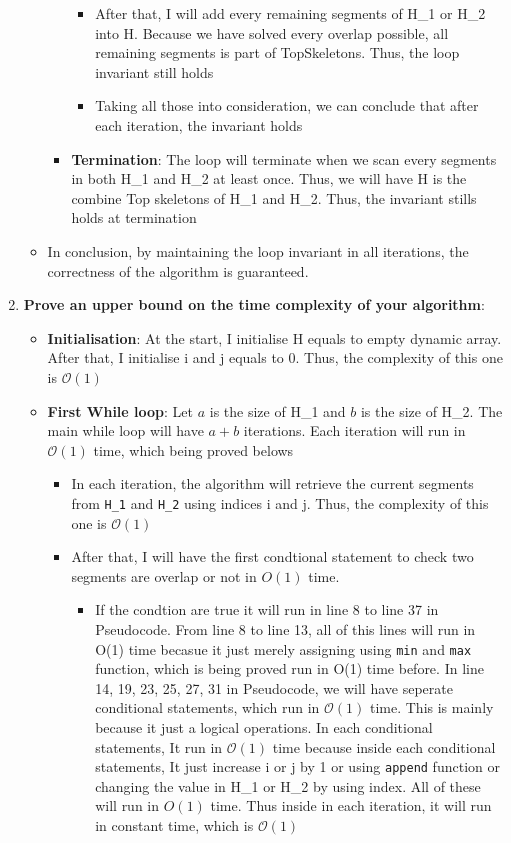 \documentclass{article}
\begin{document}
\begin{enumerate}[label=({\alph*})]
\begin{itemize}
\begin{itemize}
\begin{itemize}
					\item After that, I will add every remaining segments of H\_1 or H\_2 into H. Because we have solved every overlap possible, all remaining segments is part of TopSkeletons. Thus, the loop invariant still holds
					\item  Taking all those into consideration, we can conclude that after each iteration, the invariant holds
				\end{itemize}
				\item \textbf{Termination}: The loop will terminate when we scan every segments in both H\_1 and H\_2 at least once. Thus, we will have H is the combine Top skeletons of H\_1 and H\_2. Thus, the invariant stills holds at termination
			\end{itemize}
			\item In conclusion, by maintaining the loop invariant in all iterations, the correctness of the algorithm is guaranteed.
		\end{itemize}
		\item \textbf{Prove an upper bound on the time complexity of your algorithm}:
		\begin{itemize}
			\item \textbf{Initialisation}: At the start, I initialise H equals to empty dynamic array. After that, I initialise i and j equals to 0. Thus, the complexity of this one is \(\mathcal{O}(1)\)
			\item \textbf{First While loop}: Let \(a\) is the size of H\_1 and \(b\) is the size of H\_2. The main while loop will have \(a + b\) iterations. Each iteration will run in \(\mathcal{O}(1)\) time, which being proved belows
			\begin{itemize}
				\item In each iteration, the algorithm will retrieve the current segments from \verb|H_1| and \verb|H_2| using indices i and j. Thus, the complexity of this one is \(\mathcal{O}(1)\) 
				\item After that, I will have the first condtional statement to check two segments are overlap or not in \(O(1)\) time. 
				\begin{itemize}
					\item If the condtion are true it will run in line 8 to line 37 in Pseudocode. From line 8 to line 13, all of this lines will run in O(1) time becasue it just merely assigning using \verb|min| and \verb|max| function, which is being proved run in O(1) time before. In line 14, 19, 23, 25, 27, 31 in Pseudocode, we will have seperate conditional statements, which run in \(\mathcal{O}(1)\) time. This is mainly because it just a logical operations. In each conditional statements, It run in \(\mathcal{O(1)}\) time because inside each conditional statements, It just increase i or j by 1 or using \verb|append| function or changing the value in H\_1 or H\_2 by using index. All of these will run in \(O(1)\) time. Thus inside in each iteration, it will run in constant time, which is \(\mathcal{O}(1)\)

\end{itemize}
\end{itemize}
\end{itemize}
\end{enumerate}
\end{document}
